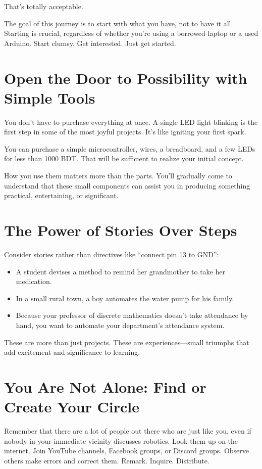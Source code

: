 \documentclass[a4paper,10pt,twocolumn]{memoir}
\begin{document}
That’s totally acceptable.

The goal of this journey is to start with what you have, not to have it all. Starting is crucial, regardless of whether you’re using a borrowed laptop or a used Arduino. Start clumsy. Get interested. Just get started.
\section*{Open the Door to Possibility with Simple Tools}
You don’t have to purchase everything at once. A single LED light blinking is the first step in some of the most joyful projects. It’s like igniting your first spark.

You can purchase a simple microcontroller, wires, a breadboard, and a few LEDs for less than 1000 BDT. That will be sufficient to realize your initial concept.

How you use them matters more than the parts. You’ll gradually come to understand that these small components can assist you in producing something practical, entertaining, or significant.
\section*{The Power of Stories Over Steps}
Consider stories rather than directives like ``connect pin 13 to GND'':
\begin{itemize}
    \item A student devises a method to remind her grandmother to take her medication.
    \item In a small rural town, a boy automates the water pump for his family.
    \item Because your professor of discrete mathematics doesn’t take attendance by hand, you want to automate your department’s attendance system.
\end{itemize}
These are more than just projects. These are experiences—small triumphs that add excitement and significance to learning.
\section*{You Are Not Alone: Find or Create Your Circle}
Remember that there are a lot of people out there who are just like you, even if nobody in your immediate vicinity discusses robotics. Look them up on the internet. Join YouTube channels, Facebook groups, or Discord groups. Observe others make errors and correct them. Remark. Inquire. Distribute.
\end{document}
